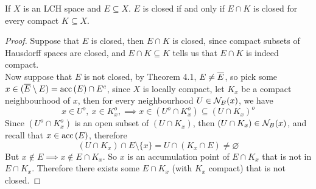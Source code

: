 \documentclass[../../main.tex]{subfiles}
\begin{document}
\begin{wts}
    If $X$ is an LCH space and $E\subseteq X$. $E$ is closed if and only if $E\cap K$ is closed for every compact $K\subseteq X$.
\end{wts}
\begin{proof}
    Suppose that $E$ is closed, then $E\cap K$ is closed, since compact subsets of Hausdorff spaces are closed, and $E\cap K\subseteq K$ tells us that $E\cap K$ is indeed compact.\\
    
    Now suppose that $E$ is not closed, by Theorem 4.1, $E\neq \overline{E}$, so pick some $x\in (\overline{E}\setminus E)=\operatorname{acc}{(E)}\cap E^c$, since $X$ is locally compact, let $K_x$ be a compact neighbourhood of $x$, then for every neighbourhood $U\in\mathcal{N}_B({x})$, we have
    \[
    x\in U^o,\:x\in K_x^o,\implies x\in (U^o\cap K_x^o)\subseteq (U\cap K_x)^o
    \]
    Since $(U^o\cap K_x^o)$ is an open subset of $(U\cap K_x)$, then $(U\cap K_x)\in\mathcal{N}_B({x})$, and recall that $x\in \operatorname{acc}{(E)}$, therefore
    \[
    (U\cap K_x)\cap E\setminus\{x\}=U\cap(K_x\cap E)\neq\varnothing
    \]
    But $x\notin E\implies x\notin E\cap K_x$. So $x$ is an accumulation point of $E\cap K_x$ that is not in $E\cap K_x$. Therefore there exists some $E\cap K_x$ (with $K_x$ compact) that is not closed.
\end{proof}
\end{document}
